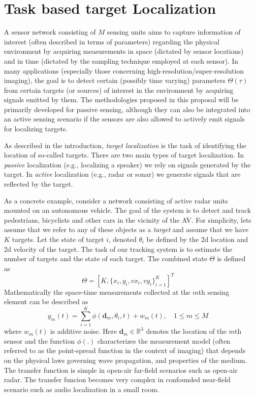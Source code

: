 \section{Task based target Localization}

A sensor network consisting of $M$ sensing units aims to capture information of interest (often described in terms of parameters) regarding the physical environment by acquiring measurements in space (dictated by sensor locations) and in time (dictated by the sampling technique employed at each sensor). In many applications (especially those concerning high-resolution/super-resolution imaging), the goal is to detect certain (possibly time varying) parameters $\Theta(\tau)$ from certain targets (or sources) of interest in the environment by acquiring signals emitted by them. The methodologies proposed in this proposal will be primarily developed for passive sensing, although they can also be integrated into an active sensing scenario if the sensors are also allowed to actively emit signals for localizing targets.

As described in the introduction, {\em target localization} is the task of identifying the location of so-called targets. There are two main types of target localization. In {\em passive} localization (e.g., localizing a speaker) we rely on signals generated by the target.   In {\em active} localization (e.g., radar or sonar) we generate signals that are reflected by the target.

As a concrete example, consider a network consisting of active radar units mounted on an autonomous vehicle. The goal of the system is to detect and track pedestrians, bicyclists and other cars in the vicinity of the AV. For simplicity, lets assume that we refer to any of these objects as a {\em target} and assume that we have $K$ targets. Let the state of target $i$, denoted $\theta_i$ be defined by the 2d location and 2d velocity of the target. The task of our tracking system is to estimate the number of targets and the state of each target.
The combined state $\Theta$ is defined as 
\begin{equation} \Theta = [K, \{x_i, y_i, vx_i ,vy_i\}_{i=1}^K]^T 
\end{equation} 
Mathematically the space-time measurements collected at the $m$th sensing element can be described as 
\begin{equation} 
y_m (t) = \sum_{i=1}^{K} \phi (\mathbf{d}_m,\theta_i,t) + w_m(t), \quad 1\leq m\leq M
\end{equation}
where $w_m(t)$ is additive noise. Here $\mathbf{d}_m\in \mathbb{R}^3$ denotes the location of the $m$th sensor and the function $\phi(.)$ characterizes the measurement model (often referred to as the point-spread function in the context of imaging) that depends on the physical laws governing wave propagation, and properties of the medium. The transfer function is simple in open-air far-field scenarios such as open-air radar. The transfer funcion becomes very complex in confounded near-field scenario such as audio localization in a small room.

